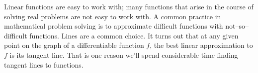 %
%
%

Linear functions are easy to work with; many functions that arise in the course of solving real problems are not easy to work with. A common practice in mathematical problem solving is to approximate difficult functions with not--so--difficult functions. Lines are a common choice. It turns out that at any given point on the graph of a differentiable function $f$, the best linear approximation to $f$ is its tangent line. That is one reason we'll spend considerable time finding tangent lines to functions.

